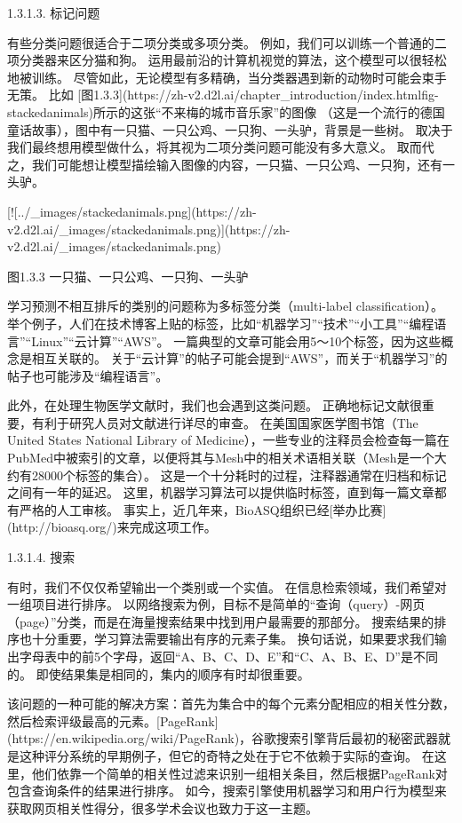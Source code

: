  1.3.1.3. 标记问题

有些分类问题很适合于二项分类或多项分类。 例如，我们可以训练一个普通的二项分类器来区分猫和狗。 运用最前沿的计算机视觉的算法，这个模型可以很轻松地被训练。 尽管如此，无论模型有多精确，当分类器遇到新的动物时可能会束手无策。 比如 [图1.3.3](https://zh-v2.d2l.ai/chapter\_introduction/index.htmlfig-stackedanimals)所示的这张“不来梅的城市音乐家”的图像 （这是一个流行的德国童话故事），图中有一只猫、一只公鸡、一只狗、一头驴，背景是一些树。 取决于我们最终想用模型做什么，将其视为二项分类问题可能没有多大意义。 取而代之，我们可能想让模型描绘输入图像的内容，一只猫、一只公鸡、一只狗，还有一头驴。

[![../\_images/stackedanimals.png](https://zh-v2.d2l.ai/\_images/stackedanimals.png)](https://zh-v2.d2l.ai/\_images/stackedanimals.png)

图1.3.3 一只猫、一只公鸡、一只狗、一头驴

学习预测不相互排斥的类别的问题称为多标签分类（multi-label classification）。 举个例子，人们在技术博客上贴的标签，比如“机器学习”“技术”“小工具”“编程语言”“Linux”“云计算”“AWS”。 一篇典型的文章可能会用5～10个标签，因为这些概念是相互关联的。 关于“云计算”的帖子可能会提到“AWS”，而关于“机器学习”的帖子也可能涉及“编程语言”。

此外，在处理生物医学文献时，我们也会遇到这类问题。 正确地标记文献很重要，有利于研究人员对文献进行详尽的审查。 在美国国家医学图书馆（The United States National Library of Medicine），一些专业的注释员会检查每一篇在PubMed中被索引的文章，以便将其与Mesh中的相关术语相关联（Mesh是一个大约有28000个标签的集合）。 这是一个十分耗时的过程，注释器通常在归档和标记之间有一年的延迟。 这里，机器学习算法可以提供临时标签，直到每一篇文章都有严格的人工审核。 事实上，近几年来，BioASQ组织已经[举办比赛](http://bioasq.org/)来完成这项工作。

 1.3.1.4. 搜索

有时，我们不仅仅希望输出一个类别或一个实值。 在信息检索领域，我们希望对一组项目进行排序。 以网络搜索为例，目标不是简单的“查询（query）-网页（page）”分类，而是在海量搜索结果中找到用户最需要的那部分。 搜索结果的排序也十分重要，学习算法需要输出有序的元素子集。 换句话说，如果要求我们输出字母表中的前5个字母，返回“A、B、C、D、E”和“C、A、B、E、D”是不同的。 即使结果集是相同的，集内的顺序有时却很重要。

该问题的一种可能的解决方案：首先为集合中的每个元素分配相应的相关性分数，然后检索评级最高的元素。[PageRank](https://en.wikipedia.org/wiki/PageRank)，谷歌搜索引擎背后最初的秘密武器就是这种评分系统的早期例子，但它的奇特之处在于它不依赖于实际的查询。 在这里，他们依靠一个简单的相关性过滤来识别一组相关条目，然后根据PageRank对包含查询条件的结果进行排序。 如今，搜索引擎使用机器学习和用户行为模型来获取网页相关性得分，很多学术会议也致力于这一主题。


